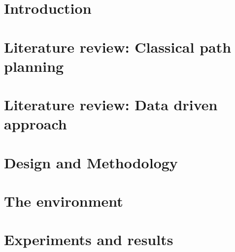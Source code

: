 \documentclass[letter,12pt,TexShade,oneside]{book}
\begin{document}
\pagestyle{fancyplain}




\onehalfspacing




%
%



\graphicspath{{img/}}



\chapter{Introduction}
\label{ch:intro}

\chapter{Literature review: Classical path planning}
\label{ch:chapter2}

\chapter{Literature review: Data driven approach}
\label{ch:chapter3}


\chapter{Design and Methodology}
\label{ch:chapter4}


\chapter{The environment}
\label{ch:chapter5}


\chapter{Experiments and results}
\label{ch:chapter6}

\end{document}
